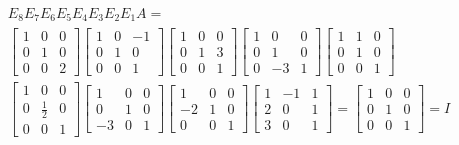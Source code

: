 \documentclass{article}
\begin{document}
\begin{enumerate}[listparindent=\parindent]
\begin{gather*}
    E_8E_7E_6E_5E_4E_3E_2E_1A = \\
    \begin{bmatrix}
        1 & 0 & 0 \\
        0 & 1 & 0 \\
        0 & 0 & 2
    \end{bmatrix}
    \begin{bmatrix}
        1 & 0 & -1 \\
        0 & 1 & 0 \\
        0 & 0 & 1
    \end{bmatrix}
    \begin{bmatrix}
        1 & 0 & 0 \\
        0 & 1 & 3 \\
        0 & 0 & 1
    \end{bmatrix}
    \begin{bmatrix}
        1 & 0 & 0 \\
        0 & 1 & 0 \\
        0 & -3 & 1
    \end{bmatrix}
    \begin{bmatrix}
        1 & 1 & 0 \\
        0 & 1 & 0 \\
        0 & 0 & 1
    \end{bmatrix}
    \\
    \begin{bmatrix}
        1 & 0 & 0 \\
        0 & \frac{1}{2} & 0 \\
        0 & 0 & 1
    \end{bmatrix}
    \begin{bmatrix}
        1 & 0 & 0 \\
        0 & 1 & 0 \\
        -3 & 0 & 1
    \end{bmatrix}
    \begin{bmatrix}
        1 & 0 & 0 \\
        -2 & 1 & 0 \\
        0 & 0 & 1
    \end{bmatrix}
    \begin{bmatrix}
        1 & -1 & 1 \\
        2 & 0 & 1 \\
        3 & 0 & 1
    \end{bmatrix}
    =
    \begin{bmatrix}
        1 & 0 & 0 \\
        0 & 1 & 0 \\
        0 & 0 & 1
    \end{bmatrix}
    = I
\end{gather*}


\end{enumerate}
\end{document}
